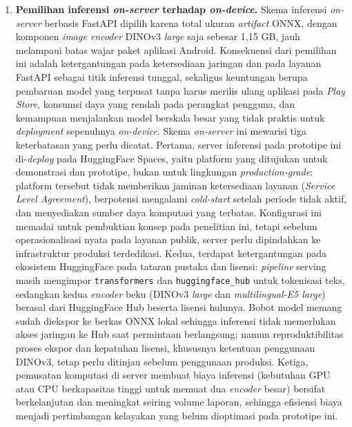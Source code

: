 \begin{enumerate}
    \item \textbf{Pemilihan inferensi \textit{on-server} terhadap \textit{on-device}.} Skema inferensi \textit{on-server} berbasis FastAPI dipilih karena total ukuran \textit{artifact} ONNX, dengan komponen \textit{image encoder} DINOv3 \textit{large} saja sebesar 1,15 GB, jauh melampaui batas wajar paket aplikasi Android. Konsekuensi dari pemilihan ini adalah ketergantungan pada ketersediaan jaringan dan pada layanan FastAPI sebagai titik inferensi tunggal, sekaligus keuntungan berupa pembaruan model yang terpusat tanpa harus merilis ulang aplikasi pada \textit{Play Store}, konsumsi daya yang rendah pada perangkat pengguna, dan kemampuan menjalankan model berskala besar yang tidak praktis untuk \textit{deployment} sepenuhnya \textit{on-device}. Skema \textit{on-server} ini mewarisi tiga keterbatasan yang perlu dicatat. Pertama, server inferensi pada prototipe ini di-\textit{deploy} pada HuggingFace Spaces, yaitu platform yang ditujukan untuk demonstrasi dan prototipe, bukan untuk lingkungan \textit{production-grade}: platform tersebut tidak memberikan jaminan ketersediaan layanan (\textit{Service Level Agreement}), berpotensi mengalami \textit{cold-start} setelah periode tidak aktif, dan menyediakan sumber daya komputasi yang terbatas. Konfigurasi ini memadai untuk pembuktian konsep pada penelitian ini, tetapi sebelum operasionalisasi nyata pada layanan publik, server perlu dipindahkan ke infrastruktur produksi terdedikasi. Kedua, terdapat ketergantungan pada ekosistem HuggingFace pada tataran pustaka dan lisensi: \textit{pipeline} serving masih mengimpor \texttt{transformers} dan \texttt{huggingface\_hub} untuk tokenisasi teks, sedangkan kedua \textit{encoder} beku (DINOv3 \textit{large} dan \textit{multilingual-E5 large}) berasal dari HuggingFace Hub beserta lisensi hulunya. Bobot model memang sudah diekspor ke berkas ONNX lokal sehingga inferensi tidak memerlukan akses jaringan ke Hub saat permintaan berlangsung; namun reproduktibilitas proses ekspor dan kepatuhan lisensi, khususnya ketentuan penggunaan DINOv3, tetap perlu ditinjau sebelum penggunaan produksi. Ketiga, pemusatan komputasi di server membuat biaya inferensi (kebutuhan GPU atau CPU berkapasitas tinggi untuk memuat dua \textit{encoder} besar) bersifat berkelanjutan dan meningkat seiring volume laporan, sehingga efisiensi biaya menjadi pertimbangan kelayakan yang belum dioptimasi pada prototipe ini.


\end{enumerate}
